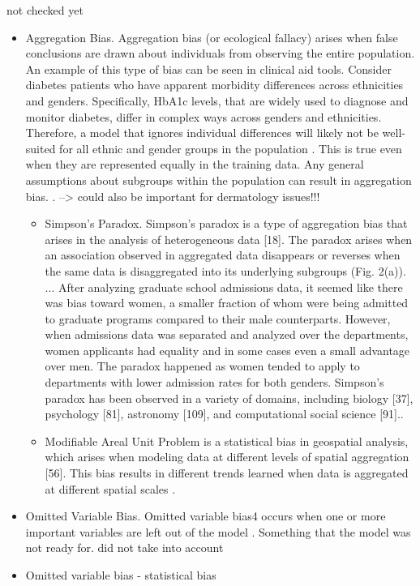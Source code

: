 \documentclass[12pt, a4paper, oneside]{book}   	%
\newif\ifrawcitationactive
\newcommand{\rawcitationend}{\color{black}\rawcitationactivefalse}
\newcommand{\rawcitationusedend}{%
	\ifrawcitationactive
	\color{purple}  %
	\else
	\color{black}  %
	\fi
}
\begin{document}
				not checked yet
				\begin{itemize}
					\item Aggregation Bias. Aggregation bias (or ecological fallacy) arises when false conclusions are drawn about individuals from observing the entire population. An example of this type of bias can be seen in clinical aid tools. Consider diabetes patients who have apparent morbidity differences across ethnicities and genders. Specifically, HbA1c levels, that are widely used to diagnose and monitor diabetes, differ in complex ways across genders and ethnicities. Therefore, a model that ignores individual differences will likely not be well-suited for all ethnic and gender groups in the population \autocite{M144_Suresh_2021}. This is true even when they are represented equally in the training data. Any general assumptions about subgroups within the population can result in aggregation bias. \autocite{Mehrabi_2021}. --> could also be important for dermatology issues!!!
					\begin{itemize}
						\item Simpson’s Paradox. Simpson’s paradox is a type of aggregation bias that arises in the analysis of heterogeneous data [18]. The paradox arises when an association observed in aggregated data disappears or reverses when the same data is disaggregated into its underlying subgroups (Fig. 2(a)). ... After analyzing graduate school admissions data, it seemed like there was bias toward women, a smaller fraction of whom were being admitted to graduate programs compared to their male counterparts. However, when admissions data was separated and analyzed over the departments, women applicants had equality and in some cases even a small advantage over men. The paradox happened as women tended to apply to departments with lower admission rates for both genders. Simpson’s paradox has been observed in a variety of domains, including biology [37], psychology [81], astronomy [109], and computational social science [91].\autocite{Mehrabi_2021}.	
						\item Modifiable Areal Unit Problem is a statistical bias in geospatial analysis, which arises when modeling data at different levels of spatial aggregation [56]. This bias results in different trends learned when data is aggregated at different spatial scales \autocite{Mehrabi_2021}.
					\end{itemize}
					
					\item Omitted Variable Bias. Omitted variable bias4 occurs when one or more important variables are left out of the model \autocites{M38_Clarke_2005}{M131_Riegg_2008}\autocite{M114_Mustard_2003}. Something that the model was not ready for\autocite{Mehrabi_2021}. did not take into account
					\item Omitted variable bias \autocites{Mester_2022}{Mester_2017} - statistical bias
				\end{itemize}
				\rawcitationend
			
\end{document}
